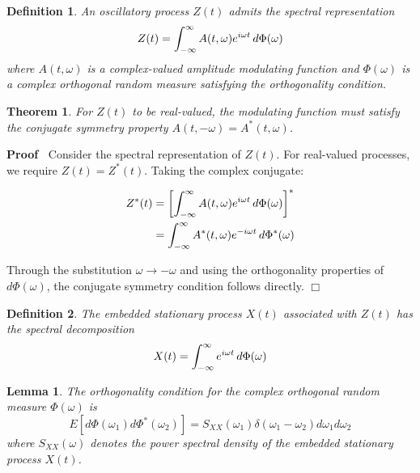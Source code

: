 \documentclass{article}
\newenvironment{proof}{\noindent\textbf{Proof\ }}{\hspace*{\fill}$\Box$\medskip}
\newtheorem{definition}{Definition}
\newtheorem{lemma}{Lemma}
\newtheorem{theorem}{Theorem}
\begin{document}
\begin{definition}
  An oscillatory process $Z (t)$ admits the spectral representation
  \begin{equation}
    Z (t) = \int_{- \infty}^{\infty} A (t, \omega) e^{i \omega t} 
    \hspace{0.17em} d \Phi (\omega)
  \end{equation}
  where $A (t, \omega)$ is a complex-valued amplitude modulating function and
  $\Phi (\omega)$ is a complex orthogonal random measure satisfying the
  orthogonality condition.
\end{definition}

\begin{theorem}
  For $Z (t)$ to be real-valued, the modulating function must satisfy the
  conjugate symmetry property $A (t, - \omega) = A^{\ast} (t, \omega)$.
\end{theorem}

\begin{proof}
  Consider the spectral representation of $Z (t)$. For real-valued processes,
  we require $Z (t) = Z^{\ast} (t)$. Taking the complex conjugate:
  
  \begin{align}
    Z^{\ast} (t) & = \left[ \int_{- \infty}^{\infty} A (t, \omega) e^{i \omega
    t}  \hspace{0.17em} d \Phi (\omega) \right]^{\ast} \\
    & = \int_{- \infty}^{\infty} A^{\ast} (t, \omega) e^{- i \omega t} 
    \hspace{0.17em} d \Phi^{\ast} (\omega) 
  \end{align}
  
  Through the substitution $\omega \to - \omega$ and using the orthogonality
  properties of $d \Phi (\omega)$, the conjugate symmetry condition follows
  directly.
\end{proof}

\begin{definition}
  The embedded stationary process $X (t)$ associated with $Z (t)$ has the
  spectral decomposition
  \begin{equation}
    X (t) = \int_{- \infty}^{\infty} e^{i \omega t}  \hspace{0.17em} d \Phi
    (\omega)
  \end{equation}
\end{definition}

\begin{lemma}
  The orthogonality condition for the complex orthogonal random measure $\Phi
  (\omega)$ is
  \begin{equation}
    E [d \Phi (\omega_1) d \Phi^{\ast} (\omega_2)] = S_{XX} (\omega_1) \delta
    (\omega_1 - \omega_2) d \omega_1 d \omega_2
  \end{equation}
  where $S_{XX} (\omega)$ denotes the power spectral density of the embedded
  stationary process $X (t)$.
\end{lemma}
\end{document}
